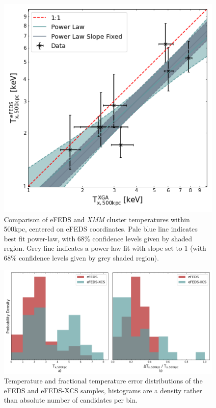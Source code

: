 \documentclass[fleqn,usenatbib]{mnras}
\begin{document}
\begin{figure}
    \centering
    \includegraphics[width=0.95\columnwidth]{images/efeds_xcs_t500cal.png}
    \caption[]{Comparison of eFEDS and {\em XMM} cluster temperatures within 500kpc, centered on eFEDS coordinates. Pale blue line indicates best fit power-law, with 68\% confidence levels given by shaded region. Grey line indicates a power-law fit with slope set to 1 (with 68\% confidence levels given by grey shaded region).}
    \label{fig:t500kpccomp}
\end{figure}

\begin{figure}
    \centering
    \includegraphics[width=1.0\textwidth]{images/efeds_xcs_txcomp.png}
    \caption[]{Temperature and fractional temperature error distributions of the eFEDS and eFEDS-XCS samples, histograms are a density rather than absolute number of candidates per bin.} 
    \label{fig:efedsxmmtxdist}
\end{figure}
\end{document}
